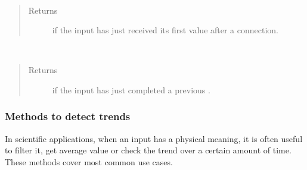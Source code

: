 \documentclass[letterpaper,10pt,english]{sphinxmanual}
\begin{document}

\begin{fulllineitems}
\label{\detokenize{io:initializing}}~\begin{quote}\begin{description}
\item[{Returns}] \leavevmode
{} if the input has just received its first value after a connection.

\end{description}\end{quote}

\end{fulllineitems}


\begin{fulllineitems}
\label{\detokenize{io:putCompleting}}~\begin{quote}\begin{description}
\item[{Returns}] \leavevmode
{} if the input has just completed a previous .

\end{description}\end{quote}

\end{fulllineitems}



\subsubsection{Methods to detect trends}
\label{\detokenize{io:methods-to-detect-trends}}
In scientific applications, when an input has a physical meaning, it is often
useful to filter it, get average value or check the trend over a certain amount
of time. These methods cover most common use cases.
\end{document}
